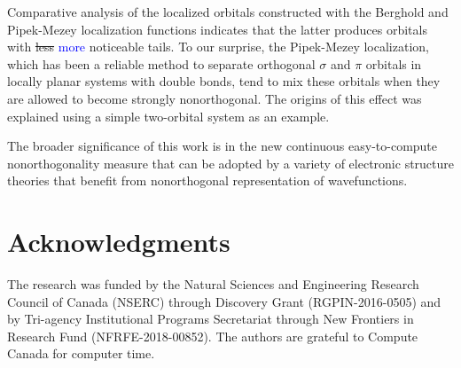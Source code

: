 \documentclass[aps,prl,reprint,amsmath,amssymb]{revtex4-1}
\begin{document}
Comparative analysis of the localized orbitals constructed with the Berghold and Pipek-Mezey localization functions indicates that the latter produces orbitals with \st{less} \textcolor{blue}{more} noticeable tails. To our surprise, the Pipek-Mezey localization, which has been a reliable method to separate orthogonal $\sigma$ and $\pi$ orbitals in locally planar systems with double bonds, tend to mix these orbitals when they are allowed to become strongly nonorthogonal. The origins of this effect was explained using a simple two-orbital system as an example.

The broader significance of this work is in the new continuous easy-to-compute nonorthogonality measure that can be adopted by a variety of electronic structure theories that benefit from nonorthogonal representation of wavefunctions. %

\section{Acknowledgments} 

The research was funded by the Natural Sciences and Engineering Research Council of Canada (NSERC) through Discovery
Grant (RGPIN-2016-0505) and by Tri-agency Institutional Programs Secretariat through New Frontiers in Research Fund (NFRFE-2018-00852). The authors are grateful to Compute Canada for computer time.

%

\end{document}
